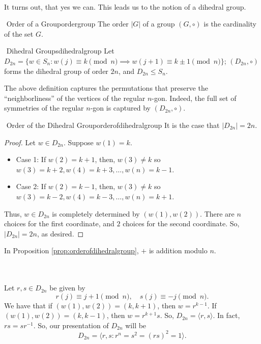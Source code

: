         \\
        It turns out, that yes we can. This leads us to the notion of a dihedral group.
        \begin{definition}{\Stop\,\,Order of a Group}{ordergroup}
            The order \(|G|\) of a group \((G,\circ)\) is the cardinality of the set \(G\).
        \end{definition}
        \begin{definition}{\Stop\,\,Dihedral Groups}{dihedralgroup}
            Let \(D_{2n}=\{w\in S_n:w(j)\equiv k\pmod n\implies w(j+1)\equiv k\pm 1\pmod n\}\); \((D_{2n},\circ)\) forms the dihedral group of order \(2n\), and \(D_{2n}\leq S_n\).
        \end{definition}
        \begin{remark*}
            The above definition captures the permutations that preserve the ``neighborliness'' of the vertices of the regular \(n\)-gon. Indeed, the full set of symmetries of the regular \(n\)-gon is captured by \((D_{2n},\circ)\).
        \end{remark*}
        \begin{proposition}{\Stop\,\,Order of the Dihedral Group}{orderofdihedralgroup}
            It is the case that \(|D_{2n}|=2n\).
            \begin{proof}
                Let \(w\in D_{2n}\). Suppose \(w(1)=k\).
                \begin{itemize}
                    \item Case 1: If \(w(2)=k+1\), then, \(w(3)\neq k\) so \(w(3)=k+2,w(4)=k+3,\ldots, w(n)=k-1\). 
                    \item Case 2: If \(w(2)=k-1\), then, \(w(3)\neq k\) so \(w(3)=k-2,w(4)=k-3,\ldots,w(n)=k+1\).
                \end{itemize}
                Thus, \(w\in D_{2n}\) is completely determined by \((w(1),w(2))\). There are \(n\) choices for the first coordinate, and \(2\) choices for the second coordinate. So, \(|D_{2n}|=2n\), as desired.
            \end{proof}
        \end{proposition}
        \begin{remark*}
            In Proposition \ref{prop:orderofdihedralgroup}, \(+\) is addition modulo \(n\).
        \end{remark*}
        \vphantom
        \\
        \\
        Let \(r,s\in D_{2n}\) be given by
        \begin{equation*}
            r(j) \equiv j+1\pmod n, \quad s(j)\equiv-j\pmod n.
        \end{equation*}
        We have that if \((w(1),w(2))=(k,k+1)\), then \(w=r^{k-1}\). If \((w(1),w(2))=(k,k-1)\), then \(w=r^{k+1}s\). So, \(D_{2n}=\langle r,s\rangle\). In fact, \(rs=sr^{-1}\). So, our presentation of \(D_{2n}\) will be
        \begin{equation*}
            D_{2n}=\langle r,s:r^n=s^2=(rs)^2=1\rangle.
        \end{equation*}


